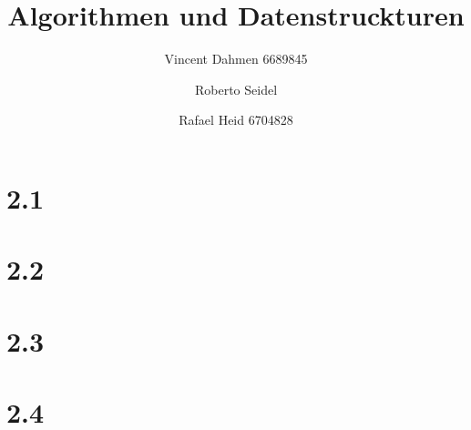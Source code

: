 \documentclass[12pt,a4paper]{article}
\title{Algorithmen und Datenstruckturen}
\author{Vincent Dahmen 6689845\and Roberto Seidel \and Rafael Heid 6704828}
\begin{document}
\maketitle{}


\section*{2.1}


\section*{2.2}


\section*{2.3}


\section*{2.4}

\end{document}

